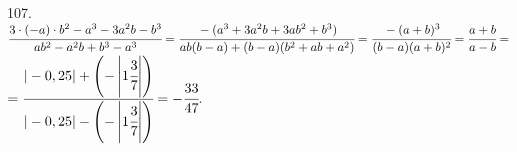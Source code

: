 107. $\cfrac{3\cdot(-a)\cdot b^2-a^3-3a^2b-b^3}{ab^2-a^2b+b^3-a^3}=\cfrac{-(a^3+3a^2b+3ab^2+b^3)}{ab(b-a)+(b-a)(b^2+ab+a^2)}=
\cfrac{-(a+b)^3}{(b-a)(a+b)^2}=\cfrac{a+b}{a-b}=$\\$=\cfrac{|-0,25|+\left(-\left|1\cfrac{3}{7}\right|\right)}{|-0,25|-\left(-\left|1\cfrac{3}{7}\right|\right)}=-\cfrac{33}{47}.$\\
